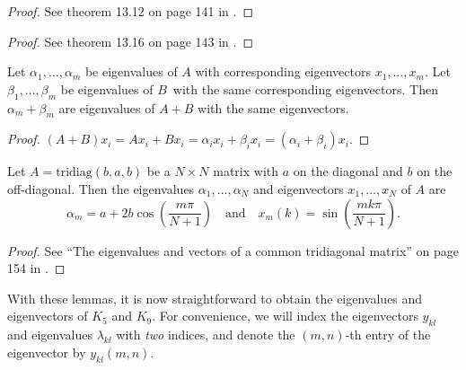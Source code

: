 \begin{lemma}\label{pde:lemma:eigkronprod}
\kroeneckerlemmatext{\otimes}{\,}
\end{lemma}
\begin{proof}
See theorem 13.12 on page 141 in \cite{Laub_2004}.
\end{proof}
\begin{lemma}\label{pde:lemma:eigkronsum}
\kroeneckerlemmatext{\oplus}{+}
\end{lemma}
\begin{proof}
See theorem 13.16 on page 143 in \cite{Laub_2004}.
\end{proof}
\begin{lemma}\label{pde:lemma:eigsum}
Let $\alpha_1, \dots, \alpha_m$ be eigenvalues of $A$ with corresponding eigenvectors $x_1, \dots, x_m$.
Let $\beta_1, \dots, \beta_m$ be eigenvalues of $B$ with the same corresponding eigenvectors.
Then $\alpha_m + \beta_m$ are eigenvalues of $A+B$ with the same eigenvectors.
\end{lemma}
\begin{proof}
$ (A + B) x_i = A x_i + B x_i = \alpha_i x_i + \beta_i x_i = (\alpha_i + \beta_i) x_i.$
\end{proof}
\begin{lemma}\label{pde:lemma:eigtst}
Let $A = \text{tridiag}(b,a,b)$ be a $N \times N$ matrix with $a$ on the diagonal and $b$ on the off-diagonal.
Then the eigenvalues $\alpha_1, \dots, \alpha_N$ and eigenvectors $x_1, \dots, x_N$ of $A$ are
\begin{equation}
\alpha_m = a + 2b \cos \left( \frac{m\pi}{N+1} \right)
\quad \text{and} \quad
x_m(k) = \sin \left( \frac{mk\pi}{N+1} \right).
\label{eq:pde:eigtst}
\end{equation}
\end{lemma}
\begin{proof}
See ``The eigenvalues and vectors of a common tridiagonal matrix'' on page 154 in \cite{Smith}.
\end{proof}

With these lemmas, it is now straightforward to obtain the eigenvalues and eigenvectors of $K_5$ and $K_9$.
For convenience, we will index the eigenvectors $y_{kl}$ and eigenvalues $\lambda_{kl}$ with \emph{two} indices, and denote the $(m,n)$-th entry of the eigenvector by $y_{kl}(m,n)$.

